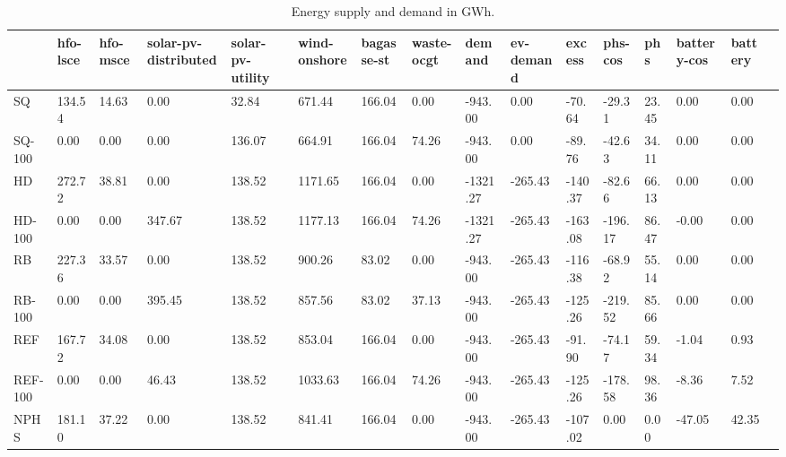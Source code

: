 \begin{table}
\centering
\caption{Energy supply and demand in GWh.}
\label{tab:energy}
\begin{tabular}{lp{1.3cm}p{1.3cm}p{1.3cm}p{1.3cm}p{1.3cm}p{1.3cm}p{1.3cm}p{1.3cm}p{1.3cm}p{1.3cm}p{1.3cm}p{1.3cm}p{1.3cm}p{1.3cm}p{1.3cm}}
\toprule
{} &  hfo-lsce &  hfo-msce &  solar-pv-distributed &  solar-pv-utility &  wind-onshore &  bagasse-st &  waste-ocgt &   demand &  ev-demand &  excess &  phs-cos &    phs &  battery-cos &  battery \\
\midrule
SQ       &    134.54 &     14.63 &                  0.00 &             32.84 &        671.44 &      166.04 &        0.00 &  -943.00 &       0.00 &  -70.64 &   -29.31 &  23.45 &         0.00 &     0.00 \\
SQ-100   &      0.00 &      0.00 &                  0.00 &            136.07 &        664.91 &      166.04 &       74.26 &  -943.00 &       0.00 &  -89.76 &   -42.63 &  34.11 &         0.00 &     0.00 \\
HD       &    272.72 &     38.81 &                  0.00 &            138.52 &       1171.65 &      166.04 &        0.00 & -1321.27 &    -265.43 & -140.37 &   -82.66 &  66.13 &         0.00 &     0.00 \\
HD-100   &      0.00 &      0.00 &                347.67 &            138.52 &       1177.13 &      166.04 &       74.26 & -1321.27 &    -265.43 & -163.08 &  -196.17 &  86.47 &        -0.00 &     0.00 \\
RB       &    227.36 &     33.57 &                  0.00 &            138.52 &        900.26 &       83.02 &        0.00 &  -943.00 &    -265.43 & -116.38 &   -68.92 &  55.14 &         0.00 &     0.00 \\
RB-100   &      0.00 &      0.00 &                395.45 &            138.52 &        857.56 &       83.02 &       37.13 &  -943.00 &    -265.43 & -125.26 &  -219.52 &  85.66 &         0.00 &     0.00 \\
REF      &    167.72 &     34.08 &                  0.00 &            138.52 &        853.04 &      166.04 &        0.00 &  -943.00 &    -265.43 &  -91.90 &   -74.17 &  59.34 &        -1.04 &     0.93 \\
REF-100  &      0.00 &      0.00 &                 46.43 &            138.52 &       1033.63 &      166.04 &       74.26 &  -943.00 &    -265.43 & -125.26 &  -178.58 &  98.36 &        -8.36 &     7.52 \\
NPHS     &    181.10 &     37.22 &                  0.00 &            138.52 &        841.41 &      166.04 &        0.00 &  -943.00 &    -265.43 & -107.02 &     0.00 &   0.00 &       -47.05 &    42.35 \\

\end{tabular}
\end{table}

